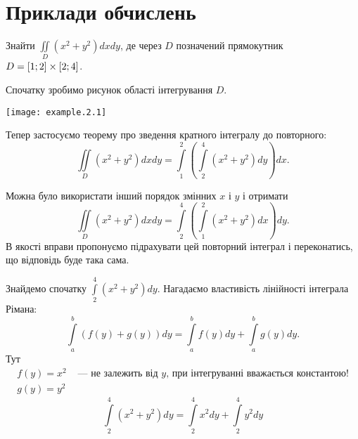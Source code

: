 \chapter{Приклади обчислень}
\begin{example}
Знайти ${\iint\limits_{D}\left(x^2+y^2\right)d x d y}$, де через $D$ позначений пря\-мо\-кут\-ник ${D = \left[1;2\right]\times\left[2;4\right]}$.

Спочатку зробимо рисунок області інтегрування $D$.

\texttt{[image: example.2.1]}

Тепер застосуємо теорему про зведення кратного інтегралу до повторного:
\[
\iint\limits_{D}\left(x^2+y^2\right)d x d y = \int\limits_1^2\left(\int\limits_{2}^{4}\left(x^{2}+y^{2}\right)d y\right)dx.
\]
\begin{remark}
Можна було використати інший порядок змінних $x$ і $y$ і отримати
\[
\iint\limits_{D}\left(x^2+y^2\right)d x d y = \int\limits_{2}^{4}\left(\int\limits_1^2\left(x^{2}+y^{2}\right) d x\right)d y.
\]
В якості вправи пропонуємо підрахувати цей повторний інтеграл і переконатись, що відповідь буде така сама.
\end{remark}
Знайдемо спочатку $\int\limits_{2}^{4}\left(x^{2}+y^{2}\right)d y$. Нагадаємо властивість лінійності інтеграла Рімана:
\[
\int\limits_{a}^{b}\left(f(y)+g(y)\right)d y = \int\limits_{a}^{b}f(y)d y+\int\limits_{a}^{b}g(y)d y.
\]
Тут
\[
\begin{array}{cc}
f(y) = x^2 & \mbox{ --- не залежить від } y\mbox{, при інтегруванні вважається константою!}\\
g(y) = y^2 &
\end{array}
\]
\[
\int\limits_{2}^{4}\left(x^{2}+y^{2}\right)d y = \int\limits_{2}^{4}x^{2}d y+\int\limits_{2}^{4}y^{2}d y
\]


\end{example}
